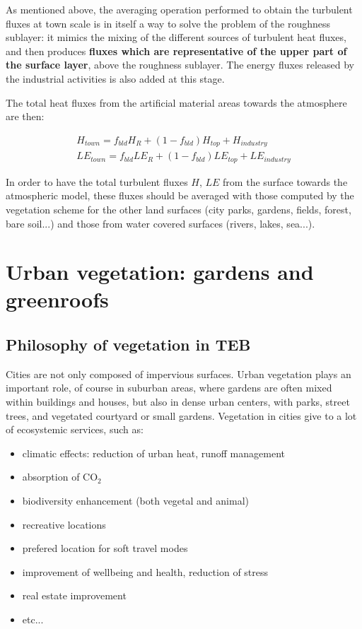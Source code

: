 As mentioned above, the averaging operation performed to obtain the
turbulent fluxes at town scale is in itself a way to solve the problem
of the roughness sublayer: it mimics the mixing of the different
sources of turbulent heat fluxes, and then produces
{\bf fluxes which are representative of
the upper part of the surface layer}, above the roughness sublayer.
The energy fluxes released by the industrial activities is also
added at this stage.

The total heat fluxes from the artificial material
areas towards the atmosphere are then:

\begin{eqnarray}
H_{town} = f_{bld} H_{R} + (1-f_{bld}) H_{top} + H_{industry} \\
LE_{town} = f_{bld} LE_{R} + (1-f_{bld}) LE_{top} + LE_{industry}
\end{eqnarray}

In order to have the total turbulent fluxes $H$, $LE$
from the surface towards the atmospheric model,
these fluxes should be averaged with those
computed by the vegetation scheme for the other land surfaces
(city parks, gardens, fields, forest, bare soil...) and
those from water covered surfaces (rivers, lakes, sea...).

\clearpage

\section{Urban vegetation: gardens and greenroofs\label{garden}}
\subsection{Philosophy of vegetation in TEB}

Cities are not only composed of impervious surfaces. Urban vegetation plays an important role, of course in suburban areas, where gardens are often mixed within buildings and houses, but also in dense urban centers, with parks, street trees, and vegetated courtyard or small gardens. Vegetation in cities give to a lot of ecosystemic services, such as: 
\begin{itemize}
\item climatic effects: reduction of urban heat, runoff management
\item absorption of CO$_2$
\item biodiversity enhancement (both vegetal and animal)
\item recreative locations
\item prefered location for soft travel modes
\item improvement of wellbeing and health, reduction of stress
\item real estate improvement
\item etc...
\end{itemize}

